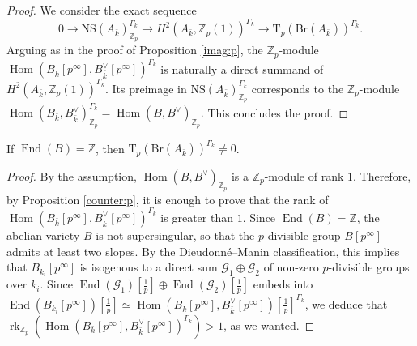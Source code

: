 \documentclass[11pt]{amsart}
\newcommand{\Z}{\mathbb{Z}}
\newcommand{\kbar}{{\bar{k}}}
\newcommand{\Zp}{{\mathbb{Z}_{p}}}
\newcommand{\calG}{\mathcal{G}}
\DeclareMathOperator{\Hom}{Hom}
\DeclareMathOperator{\End}{End}
\DeclareMathOperator{\rk}{rk}
\newcommand{\Br}{\mathrm{Br}}
\newcommand{\NS}{\mathrm{NS}}
\newcommand{\ki}{{k_i}}
\newcommand{\Tp}{\mathrm{T}_p}
\begin{document}
\begin{proof}
	We consider the exact sequence $$0\to \NS(A_{\kbar})^{\Gamma_k}_\Zp\to H^2(A_{\kbar}, \Zp(1))^{\Gamma_k}\to \Tp(\Br(A_{\kbar}))^{\Gamma_k}.$$ Arguing as in the proof of Proposition \ref{imag:p}, the $\Zp$-module $\Hom(B_\kbar[p^\infty],B_\kbar^\vee[p^\infty])^{\Gamma_k}$ is naturally a direct summand of $H^2(A_{\kbar}, \Zp(1))^{\Gamma_k}$. Its preimage in $\NS(A_{\kbar})_\Zp^{\Gamma_k}$ corresponds to the $\Zp$-module $\Hom(B_\kbar,B^\vee_\kbar)_\Zp^{\Gamma_k}=\Hom(B,B^\vee)_\Zp.$ This concludes the proof.
\end{proof}



\begin{coro}\label{count:c}
	If $\End(B)=\Z$, then $\Tp(\Br(A_{\kbar}))^{\Gamma_k}\neq 0$.
\end{coro}

\begin{proof}
By the assumption, $\Hom(B,B^\vee)_\Zp$ is a $\Zp$-module of rank $1$. Therefore, by Proposition \ref{counter:p}, it is enough to prove that the rank of $\Hom(B_\kbar[p^\infty],B_\kbar^\vee[p^\infty])^{\Gamma_k}$ is greater than $1$. Since $\End(B)=\Z$, the abelian variety $B$ is not supersingular, so that the $p$-divisible group $B[p^\infty]$ admits at least two slopes. By the Dieudonné--Manin classification, this implies that $B_{\ki}[p^\infty]$ is isogenous to a direct sum $\calG_1\oplus \calG_2$ of non-zero $p$-divisible groups over $\ki$. Since $\End(\calG_1)[\tfrac{1}{p}]\oplus \End(\calG_2)[\tfrac{1}{p}]$ embeds into $\End(B_{\ki}[p^\infty])[\tfrac{1}{p}]\simeq \Hom(B_\kbar[p^\infty],B_\kbar^\vee[p^\infty])[\tfrac{1}{p}]^{\Gamma_k}$, we deduce that $\rk_\Zp(\Hom(B_\kbar[p^\infty],B_\kbar^\vee[p^\infty])^{\Gamma_k})>1$, as we wanted.
\end{proof}

\end{document}
